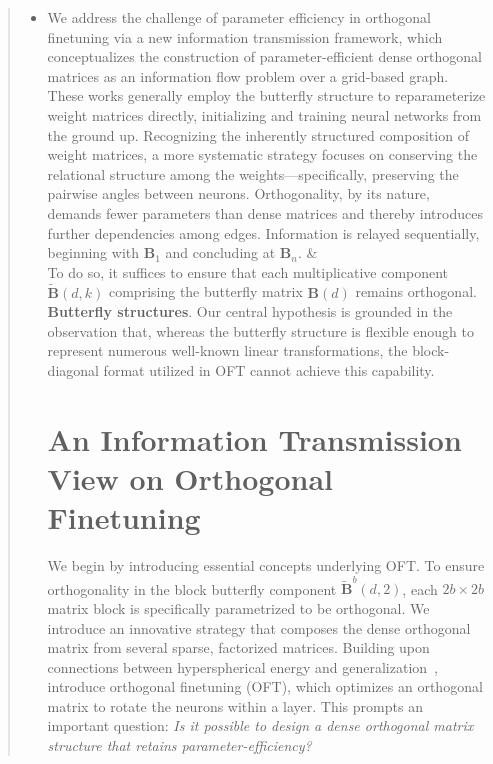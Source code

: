 \begin{abstract}
\begin{itemize}[leftmargin=*,nosep]
    \item We address the challenge of parameter efficiency in orthogonal finetuning via a new information transmission framework, which conceptualizes the construction of parameter-efficient dense orthogonal matrices as an information flow problem over a grid-based graph. These works generally employ the butterfly structure to reparameterize weight matrices directly, initializing and training neural networks from the ground up. Recognizing the inherently structured composition of weight matrices, a more systematic strategy focuses on conserving the relational structure among the weights—specifically, preserving the pairwise angles between neurons. Orthogonality, by its nature, demands fewer parameters than dense matrices and thereby introduces further dependencies among edges. Information is relayed sequentially, beginning with $\bm{B}_1$ and concluding at $\bm{B}_n$. &  \\
    \!\!\!\!\! To do so, it suffices to ensure that each multiplicative component $\tilde{\bm{B}}(d,k)$ comprising the butterfly matrix $\bm{B}(d)$ remains orthogonal. \textbf{Butterfly structures}. Our central hypothesis is grounded in the observation that, whereas the butterfly structure is flexible enough to represent numerous well-known linear transformations, the block-diagonal format utilized in OFT cannot achieve this capability. \section{An Information Transmission View on Orthogonal Finetuning}

We begin by introducing essential concepts underlying OFT. To ensure orthogonality in the block butterfly component $\tilde{\bm{B}}^b(d,2)$, each $2b\times 2b$ matrix block is specifically parametrized to be orthogonal. We introduce an innovative strategy that composes the dense orthogonal matrix from several sparse, factorized matrices. Building upon connections between hyperspherical energy and generalization~\cite{liu2018learning,liu2021orthogonal}, \cite{qiu2023controlling} introduce orthogonal finetuning (OFT), which optimizes an orthogonal matrix to rotate the neurons within a layer. This prompts an important question: \emph{Is it possible to design a dense orthogonal matrix structure that retains parameter-efficiency?}


\end{itemize}
\end{abstract}
